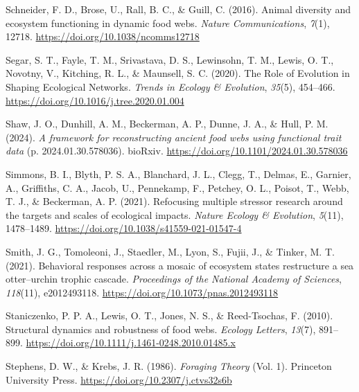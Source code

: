 \documentclass[
]{article}
\newlength{\cslhangindent}
\newenvironment{CSLReferences}[2] %
 {\begin{list}{}{%
  \setlength{\itemindent}{0pt}
  \setlength{\leftmargin}{0pt}
  \setlength{\parsep}{0pt}
  \ifodd #1
   \setlength{\leftmargin}{\cslhangindent}
   \setlength{\itemindent}{-1\cslhangindent}
  \fi
  \setlength{\itemsep}{#2\baselineskip}}}
 {\end{list}}
\begin{document}
\begin{CSLReferences}{1}{0}
Schneider, F. D., Brose, U., Rall, B. C., \& Guill, C. (2016). Animal
diversity and ecosystem functioning in dynamic food webs. \emph{Nature
Communications}, \emph{7}(1), 12718.
\url{https://doi.org/10.1038/ncomms12718}

Segar, S. T., Fayle, T. M., Srivastava, D. S., Lewinsohn, T. M., Lewis,
O. T., Novotny, V., Kitching, R. L., \& Maunsell, S. C. (2020). The
{Role} of {Evolution} in {Shaping Ecological Networks}. \emph{Trends in
Ecology \& Evolution}, \emph{35}(5), 454--466.
\url{https://doi.org/10.1016/j.tree.2020.01.004}

Shaw, J. O., Dunhill, A. M., Beckerman, A. P., Dunne, J. A., \& Hull, P.
M. (2024). \emph{A framework for reconstructing ancient food webs using
functional trait data} (p. 2024.01.30.578036). bioRxiv.
\url{https://doi.org/10.1101/2024.01.30.578036}

Simmons, B. I., Blyth, P. S. A., Blanchard, J. L., Clegg, T., Delmas,
E., Garnier, A., Griffiths, C. A., Jacob, U., Pennekamp, F., Petchey, O.
L., Poisot, T., Webb, T. J., \& Beckerman, A. P. (2021). Refocusing
multiple stressor research around the targets and scales of ecological
impacts. \emph{Nature Ecology \& Evolution}, \emph{5}(11), 1478--1489.
\url{https://doi.org/10.1038/s41559-021-01547-4}

Smith, J. G., Tomoleoni, J., Staedler, M., Lyon, S., Fujii, J., \&
Tinker, M. T. (2021). Behavioral responses across a mosaic of ecosystem
states restructure a sea otter--urchin trophic cascade.
\emph{Proceedings of the National Academy of Sciences}, \emph{118}(11),
e2012493118. \url{https://doi.org/10.1073/pnas.2012493118}

Staniczenko, P. P. A., Lewis, O. T., Jones, N. S., \& Reed-Tsochas, F.
(2010). Structural dynamics and robustness of food webs. \emph{Ecology
Letters}, \emph{13}(7), 891--899.
\url{https://doi.org/10.1111/j.1461-0248.2010.01485.x}

Stephens, D. W., \& Krebs, J. R. (1986). \emph{Foraging {Theory}} (Vol.
1). Princeton University Press.
\url{https://doi.org/10.2307/j.ctvs32s6b}


\end{CSLReferences}
\end{document}
